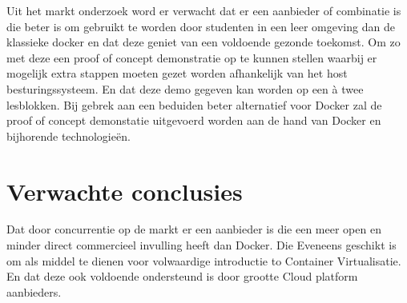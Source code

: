 Uit het markt onderzoek word er verwacht dat er een aanbieder of combinatie is die beter is om gebruikt te worden door studenten in een leer omgeving dan de klassieke docker en dat deze geniet van een voldoende gezonde toekomst.  Om zo met deze een proof of concept demonstratie op te kunnen stellen waarbij er mogelijk extra stappen moeten gezet worden afhankelijk van het host besturingssysteem. En dat deze demo gegeven kan worden op een à twee lesblokken. 
Bij gebrek aan een beduiden beter alternatief voor Docker zal de proof of concept demonstatie  uitgevoerd worden aan de hand van Docker en bijhorende technologieën. 


\section{Verwachte conclusies}
\label{sec:verwachte_conclusies}

Dat door concurrentie op de markt er een aanbieder is die een meer open en minder direct commercieel invulling heeft dan Docker. Die Eveneens geschikt is om als middel te dienen voor volwaardige introductie to Container Virtualisatie. En dat deze ook voldoende ondersteund is door grootte Cloud platform aanbieders.  

